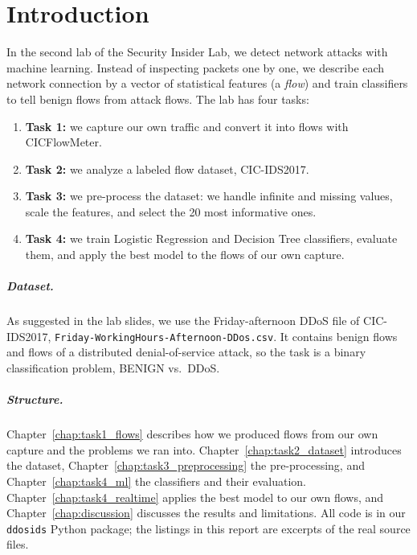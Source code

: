 \chapter{Introduction}\label{chap:introduction}

In the second lab of the Security Insider Lab, we detect network attacks with machine learning. Instead of inspecting packets one by one, we describe each network connection by a vector of statistical features (a \emph{flow}) and train classifiers to tell benign flows from attack flows. The lab has four tasks:

\begin{enumerate}\setlength\itemsep{0pt}
	\item \textbf{Task 1:} we capture our own traffic and convert it into flows with CICFlowMeter.
	\item \textbf{Task 2:} we analyze a labeled flow dataset, CIC-IDS2017.
	\item \textbf{Task 3:} we pre-process the dataset: we handle infinite and missing values, scale the features, and select the 20 most informative ones.
	\item \textbf{Task 4:} we train Logistic Regression and Decision Tree classifiers, evaluate them, and apply the best model to the flows of our own capture.
\end{enumerate}

\paragraph{Dataset.} As suggested in the lab slides, we use the Friday-afternoon DDoS file of CIC-IDS2017, \texttt{Friday-WorkingHours-Afternoon-DDos.csv}. It contains benign flows and flows of a distributed denial-of-service attack, so the task is a binary classification problem, BENIGN vs.\ DDoS.

\paragraph{Structure.} Chapter~\ref{chap:task1_flows} describes how we produced flows from our own capture and the problems we ran into. Chapter~\ref{chap:task2_dataset} introduces the dataset, Chapter~\ref{chap:task3_preprocessing} the pre-processing, and Chapter~\ref{chap:task4_ml} the classifiers and their evaluation. Chapter~\ref{chap:task4_realtime} applies the best model to our own flows, and Chapter~\ref{chap:discussion} discusses the results and limitations. All code is in our \texttt{ddosids} Python package; the listings in this report are excerpts of the real source files.
